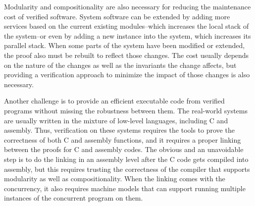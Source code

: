 Modularity and compositionality are also necessary for reducing the maintenance cost of verified software. 
System software can be extended by adding more services based on the current existing modules--which increases the local stack of the system--or
even by adding a new instance into the system, which increases its parallel stack. 
When some parts of the system have been modified or extended, the proof also must be rebuilt to reflect those changes. 
The cost usually depends on the nature of the changes as well as the invariants the change affects, 
but providing a verification approach to minimize the impact of those changes is also necessary.

%

Another challenge is to provide an efficient executable code from verified programs without missing the robustness between them.
 The real-world systems are usually written in the mixture of low-level languages, including C and assembly. 
 Thus, verification on these systems requires the tools to prove the correctness of both C and assembly functions, and it requires a proper linking
  between the proofs for C and assembly codes. The obvious and an unavoidable step is to do the linking in an assembly level after the C code gets
   compiled into assembly, but this requires trusting the correctness of the compiler that supports modularity as well as compositionality. 
   When the linking comes with the concurrency, it also requires machine models that can support running multiple instances of 
   the concurrent program on them.

